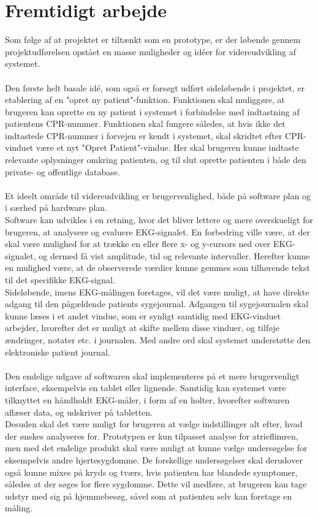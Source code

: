 \section{Fremtidigt arbejde}
Som følge af at projektet er tiltænkt som en prototype, er der løbende gennem projektudførelsen opstået en masse muligheder og idéer for videreudvikling af systemet. \\\\
Den første helt basale idé, som også er forsøgt udført sideløbende i projektet, er etablering af en "opret ny patient"\--funktion. Funktionen skal muliggøre, at brugeren kan oprette en ny patient i systemet i forbindelse med indtastning af patientens CPR-nummer. Funktionen skal fungere således, at hvis ikke det indtastede CPR-nummer i forvejen er kendt i systemet, skal skridtet efter CPR-vinduet være et nyt "Opret Patient"\--vindue. Her skal brugeren kunne indtaste relevante oplysninger omkring patienten, og til slut oprette patienten i både den private- og offentlige database.\\\\
Et ideelt område til videreudvikling er brugervenlighed, både på software plan og i særhed på hardware plan.\\
Software kan udvikles i en retning, hvor det bliver lettere og mere overskueligt for brugeren, at analysere og evaluere EKG-signalet. En forbedring ville være, at der skal være mulighed for at trække en eller flere x- og y-cursors ned over EKG-signalet, og dermed få vist amplitude, tid og relevante intervaller. Herefter kunne en mulighed være, at de observerede værdier kunne gemmes som tilhørende tekst til det specifikke EKG-signal. \\
Sideløbende, imens EKG-målingen foretages, vil det være muligt, at have direkte adgang til den pågældende patients sygejournal. Adgangen til sygejournalen skal kunne læses i et andet vindue, som er synligt samtidig med EKG-vinduet arbejder, hvorefter det er muligt at skifte mellem disse vinduer, og tilføje ændringer, notater etc. i journalen. Med andre ord skal systemet understøtte den elektroniske patient journal.\\ \\
Den endelige udgave af softwaren skal implementeres på et mere brugervenligt interface, eksempelvis en tablet eller lignende. Samtidig kan systemet være tilknyttet en håndholdt EKG-måler, i form af en holter, hvorefter softwaren aflæser data, og udskriver på tabletten.\\ Desuden skal det være muligt for brugeren at vælge indstillinger alt efter, hvad der ønskes analyseres for. Prototypen er kun tilpasset analyse for atrieflimren, men med det endelige produkt skal være muligt at kunne vælge undersøgelse for eksempelvis andre hjertesygdomme. De forskellige undersøgelser skal derudover også kunne mixes på kryds og tværs, hvis patienten har blandede symptomer, således at der søges for flere sygdomme. Dette vil medføre, at brugeren kan tage udstyr med sig på hjemmebesøg, såvel som at patienten selv kan foretage en måling.

